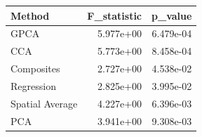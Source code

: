 \begin{tabular}{lrr}
\toprule
Method & F_statistic & p_value \\
\midrule
GPCA & 5.977e+00 & 6.479e-04 \\
CCA & 5.773e+00 & 8.458e-04 \\
Composites & 2.727e+00 & 4.538e-02 \\
Regression & 2.825e+00 & 3.995e-02 \\
Spatial Average & 4.227e+00 & 6.396e-03 \\
PCA & 3.941e+00 & 9.308e-03 \\
\bottomrule
\end{tabular}

